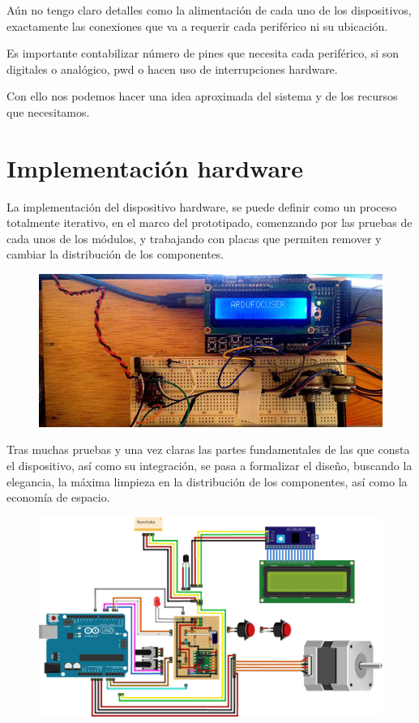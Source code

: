 Aún no tengo claro detalles como la alimentación de cada uno de los dispositivos,  exactamente las conexiones que va a requerir cada periférico ni su ubicación.

\bigskip
Es importante contabilizar número de pines que necesita cada periférico, si son digitales o analógico, pwd o hacen uso de interrupciones hardware. 

\bigskip
Con ello nos podemos hacer una idea aproximada del sistema y de los recursos que necesitamos.


\newpage
\section{Implementación hardware}

La implementación del dispositivo hardware, se puede definir como un proceso totalmente iterativo, en el marco del prototipado, comenzando por las pruebas de cada unos de los módulos, y trabajando con placas que permiten remover y cambiar la distribución de los componentes.



\begin{figure}[h]
\centering
\includegraphics[width=0.7\linewidth]{../images/proto_recorte}
\caption{}
\label{fig:prototipoArdufocuser}
\end{figure}

\bigskip
Tras muchas pruebas y una vez claras las partes fundamentales de las que consta el dispositivo, así como su integración, se pasa a formalizar el diseño, buscando la elegancia, la máxima limpieza en la distribución de los componentes, así como la economía de espacio.

\begin{figure}[h]
	\centering
	\includegraphics[width=1\linewidth]{../images/circuito}
	\caption{}
	\label{fig:prototipoArdufocuser}
\end{figure}


